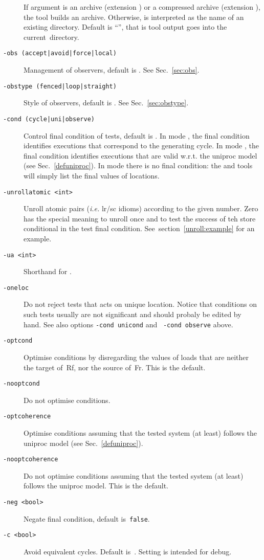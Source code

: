 \begin{description}
If  argument  is an archive (extension )
or a compressed archive (extension ),
the tool builds an archive.
Otherwise,  is interpreted as the name of an
existing directory.
Default is ``'', that is tool output goes into the
current~directory.
\item[{\tt -obs (accept|avoid|force|local)}] Management of observers,
default is . See Sec.~\ref{sec:obs}.
\item[{\tt -obstype (fenced|loop|straight)}]
Style of observers, default is . See Sec.~\ref{sec:obstype}.
\item[{\tt -cond (cycle|uni|observe)}]
Control final condition of tests, default is .
In mode , the final condition identifies executions
that correspond to the generating cycle.
In mode , the final condition identifies executions
that are valid w.r.t. the uniproc model (see Sec.~\ref{defuniproc}).
In mode   there is no final condition:
the \litmus{} and \herd{} tools will simply list the final
values of locations.
\item[{\tt -unrollatomic <int>}] Unroll atomic pairs (\emph{i.e.} lr/sc idioms)
according to the given number. Zero has the special meaning to unroll once and
to test the success of teh store conditional in the test final condition. See~section~\ref{unroll:example} for an example.
\item[{\tt -ua <int>}] Shorthand for .
\item[{\tt -oneloc}] Do not reject tests that acts on unique location.
Notice that conditions on such tests usually are not significant
and should probaly be edited by hand. See also options
\texttt{-cond unicond} and~ \texttt{-cond observe} above.
\item [{\tt -optcond}] Optimise conditions by disregarding the values
of loads that are neither the target of~Rf, nor the source of~Fr. This is
the default.
\item [{\tt -nooptcond}] Do not optimise conditions.
\item [{\tt -optcoherence}] Optimise conditions assuming that
the tested system (at least) follows the uniproc model
(see Sec.~\ref{defuniproc}).
\item [{\tt -nooptcoherence}] Do not optimise conditions assuming that
the tested system (at least) follows the uniproc model. This is the default.
\item [{\tt -neg <bool>}] Negate final condition, default is~\texttt{false}.
\item[{\tt -c <bool>}] Avoid equivalent cycles. Default is~.
Setting  is intended for debug.
\end{description}

